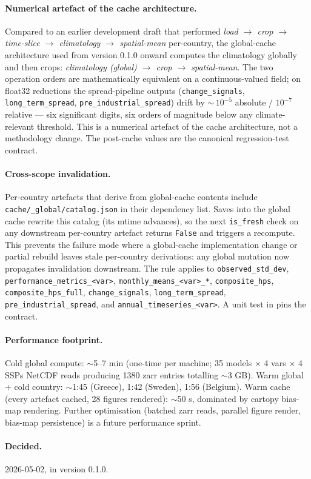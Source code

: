 \documentclass[11pt,a4paper]{article}
\begin{document}
\paragraph{Numerical artefact of the cache architecture.} Compared to
an earlier development draft that performed \emph{load $\rightarrow$
crop $\rightarrow$ time-slice $\rightarrow$ climatology $\rightarrow$
spatial-mean} per-country, the global-cache architecture used from
version 0.1.0 onward computes the climatology globally and then crops:
\emph{climatology (global) $\rightarrow$ crop $\rightarrow$
spatial-mean}. The two operation orders are mathematically equivalent
on a continuous-valued field; on float32 reductions the spread-pipeline
outputs (\texttt{change\_signals}, \texttt{long\_term\_spread},
\texttt{pre\_industrial\_spread}) drift by $\sim$\,$10^{-5}$ absolute /
$10^{-7}$ relative --- six significant digits, six orders of magnitude
below any climate-relevant threshold. This is a numerical artefact of
the cache architecture, not a methodology change. The post-cache
values are the canonical regression-test contract.

\paragraph{Cross-scope invalidation.} Per-country artefacts that derive
from global-cache contents include
\texttt{cache/\_global/catalog.json} in their dependency list. Saves
into the global cache rewrite this catalog (its mtime advances), so
the next \texttt{is\_fresh} check on any downstream per-country
artefact returns \texttt{False} and triggers a recompute. This
prevents the failure mode where a global-cache implementation change
or partial rebuild leaves stale per-country derivations: any global
mutation now propagates invalidation downstream. The rule applies to
\texttt{observed\_std\_dev}, \texttt{performance\_metrics\_<var>},
\texttt{monthly\_means\_<var>\_*}, \texttt{composite\_hps},
\texttt{composite\_hps\_full}, \texttt{change\_signals},
\texttt{long\_term\_spread}, \texttt{pre\_industrial\_spread}, and
\texttt{annual\_timeseries\_<var>}. A unit test in
 pins
the contract.

\paragraph{Performance footprint.} Cold global compute: $\sim$5--7 min
(one-time per machine; 35 models $\times$ 4 vars $\times$ 4 SSPs
NetCDF reads producing 1380 zarr entries totalling $\sim$3 GB). Warm
global + cold country: $\sim$1:45 (Greece), 1:42 (Sweden), 1:56
(Belgium). Warm cache (every artefact cached, 28 figures rendered):
$\sim$50 s, dominated by cartopy bias-map rendering. Further
optimisation (batched zarr reads, parallel figure render, bias-map
persistence) is a future performance sprint.

\paragraph{Decided.} 2026-05-02, in version 0.1.0.



\end{document}
